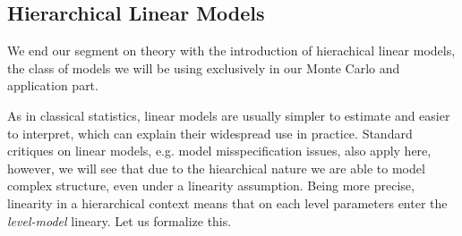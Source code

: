 %

\subsection{Hierarchical Linear Models}
We end our segment on theory with the introduction of hierachical linear models, the class of models we will be using exclusively in our Monte Carlo and application part.

As in classical statistics, linear models are usually simpler to estimate and easier to interpret, which can explain their widespread use in practice.
Standard critiques on linear models, e.g. model misspecification issues, also apply here, however, we will see that due to the hiearchical nature we are able to model complex structure, even under a linearity assumption.
Being more precise, linearity in a hierarchical context means that on each level parameters enter the \emph{level-model} lineary.
Let us formalize this.

